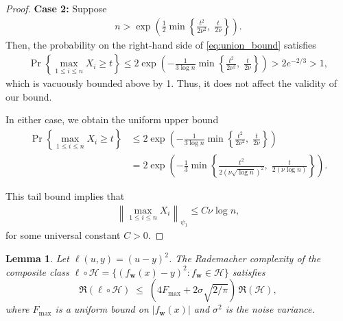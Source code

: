 \documentclass{article}
\theoremstyle{plain}
\newtheorem{lemma}[theorem]{Lemma}
\theoremstyle{definition}
\theoremstyle{remark}
\begin{document}
\begin{proof}
\smallskip
\textbf{Case 2:} Suppose
\begin{align*}
    n > \exp\left(
        \frac{1}{2} \min\left\{
            \frac{t^2}{2\nu^{2}},\;
            \frac{t}{2\nu}
        \right\}
    \right).
\end{align*}
Then, the probability on the right-hand side of \cref{eq:union_bound} satisfies
\begin{align*}
    \Pr\left\{ \max_{1 \leq i \leq n} X_i \ge t \right\}
    \le
    2\exp\left(
        -\frac{1}{3\log n}
        \min\left\{
            \frac{t^2}{2\nu^2},\;
            \frac{t}{2\nu}
        \right\}
    \right)
    > 2e^{-2/3} > 1,
\end{align*}
which is vacuously bounded above by 1. Thus, it does not affect the validity of our bound.

In either case, we obtain the uniform upper bound
\begin{align*}
    \Pr\left\{ \max_{1 \leq i \leq n} X_i \ge t \right\}
    &\le
    2\exp\left(
        -\frac{1}{3\log n}
        \min\left\{
            \frac{t^2}{2\nu^2},\;
            \frac{t}{2\nu}
        \right\}
    \right) \\
    &=
    2\exp\left(
        -\frac{1}{3}
        \min\left\{
            \frac{t^2}{2(\nu\sqrt{\log n})^2},\;
            \frac{t}{2(\nu\log n)}
        \right\}
    \right).
\end{align*}

This tail bound implies that
\begin{align*}
    \left\| \max_{1 \leq i \leq n} X_i \right\|_{\psi_1} \leq C \nu \log n,
\end{align*}
for some universal constant \( C > 0 \).
\end{proof}
\begin{lemma}
\label{lem:contraction_rad}
Let $\ell(u,y) = (u - y)^2$.  The Rademacher complexity of the composite class
$\ell \circ \mathcal{H} = \{(f_{\bm w}(x) - y)^2 : f_{\bm w}\in\mathcal{H}\}$ satisfies
\[
\mathfrak{R}(\ell\circ\mathcal{H})
\;\le\;
\left(4F_{\max} + 2\sigma\sqrt{2/\pi}\right)\,
\mathfrak{R}(\mathcal{H}),
\]
where $F_{\max}$ is a uniform bound on $|f_{\bm w}(x)|$ and $\sigma^2$ is the noise variance. 
\end{lemma}
\end{document}
